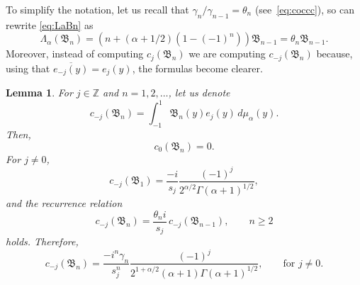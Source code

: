 \documentclass[10pt,a4paper]{article}
\theoremstyle{plain}
\newtheorem{lemma}[theorem]{Lemma}
\theoremstyle{definition}
\numberwithin{equation}{section} %
\newcommand{\La}{\Lambda_{\alpha}}
\newcommand{\mua}{\mu_{\alpha}}
\newcommand{\B}{\mathfrak{B}}
\newcommand{\ZZ}{\mathbb{Z}}
\newcommand{\cc}{\gamma}
\begin{document}
To simplify the notation, let us recall that ${\cc_{n}}/{\cc_{n-1}} = \theta_{n}$ (see~\eqref{eq:coccc}), so can rewrite \eqref{eq:LaBn} as
\begin{equation}
\label{eq:LaBnk}
  \La(\B_{n}) = (n+(\alpha+1/2)(1-(-1)^{n})) \B_{n-1}
  = \theta_{n} \B_{n-1}.
\end{equation}
Moreover, instead of computing $c_{j}(\B_n)$ we are computing $c_{-j}(\B_n)$ because, using that $\overline{e_{-j}(y)} = e_{j}(y)$, the formulas become clearer.

\begin{lemma}
For $j \in \ZZ$ and $n=1,2,\dots$, let us denote
\[
  c_{-j}(\B_n) = \int_{-1}^{1} \B_n(y) e_j(y) \,d\mua(y).
\]
Then,
\begin{equation}
\label{eq:c0Bn}
  c_{0}(\B_n) = 0.
\end{equation}
For $j \ne 0$,
\begin{equation}
\label{eq:cjB1}
  c_{-j}(\B_1) = \frac{-i}{s_j} \frac{(-1)^j}{2^{\alpha/2}\Gamma(\alpha+1)^{1/2}},
\end{equation}
and the recurrence relation
\[
  c_{-j}(\B_n) = \frac{\theta_{n}i}{s_j} \, c_{-j}(\B_{n-1}),
  \qquad n \ge 2
\]
holds. Therefore,
\[
  c_{-j}(\B_n) = \frac{-i^n \cc_n}{s_j^n}
  \frac{(-1)^j}{2^{1+\alpha/2}(\alpha+1)\Gamma(\alpha+1)^{1/2}},
  \qquad \text{for $j \ne 0$}.
\]
\end{lemma}
\end{document}
